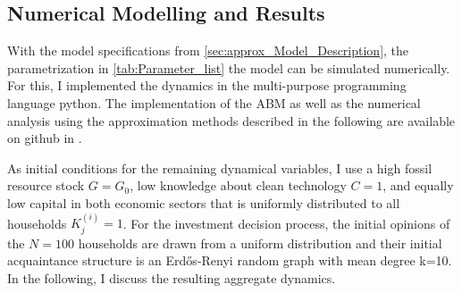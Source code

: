   
\subsection{Numerical Modelling and Results} 
\label{sec:numerical_results}

With the model specifications from \cref{sec:approx_Model_Description}, the parametrization in \cref{tab:Parameter_list} the model can be simulated numerically.
For this, I implemented the dynamics in the multi-purpose programming language python. The implementation of the ABM as well as the numerical analysis using the approximation methods described in the following are available on github in \cite{kolb2018}.

As initial conditions for the remaining dynamical variables, I use a high fossil resource stock $G=G_0$, low knowledge about clean technology $C=1$, and equally low capital in both economic sectors that is uniformly distributed to all households $K_j^{(i)}=1$. For the investment decision process, the initial opinions of the $N=100$ households are drawn from a uniform distribution and their initial acquaintance structure is an Erd\H{o}s-Renyi random graph with mean degree k=10.
In the following, I discuss the resulting aggregate dynamics.




